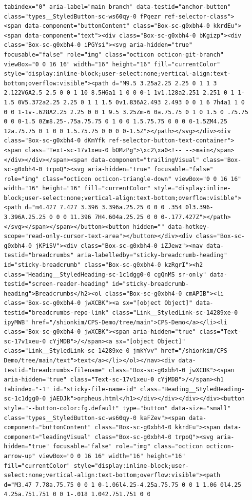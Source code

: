 \documentclass[
  letterpaper,
]{book}
\begin{document}
\begin{verbatim}
tabindex="0" aria-label="main branch" data-testid="anchor-button" class="types__StyledButton-sc-ws60qy-0 fPqezr ref-selector-class"><span data-component="buttonContent" class="Box-sc-g0xbh4-0 kkrdEu"><span data-component="text"><div class="Box-sc-g0xbh4-0 bKgizp"><div class="Box-sc-g0xbh4-0 iPGYsi"><svg aria-hidden="true" focusable="false" role="img" class="octicon octicon-git-branch" viewBox="0 0 16 16" width="16" height="16" fill="currentColor" style="display:inline-block;user-select:none;vertical-align:text-bottom;overflow:visible"><path d="M9.5 3.25a2.25 2.25 0 1 1 3 2.122V6A2.5 2.5 0 0 1 10 8.5H6a1 1 0 0 0-1 1v1.128a2.251 2.251 0 1 1-1.5 0V5.372a2.25 2.25 0 1 1 1.5 0v1.836A2.493 2.493 0 0 1 6 7h4a1 1 0 0 0 1-1v-.628A2.25 2.25 0 0 1 9.5 3.25Zm-6 0a.75.75 0 1 0 1.5 0 .75.75 0 0 0-1.5 0Zm8.25-.75a.75.75 0 1 0 0 1.5.75.75 0 0 0 0-1.5ZM4.25 12a.75.75 0 1 0 0 1.5.75.75 0 0 0 0-1.5Z"></path></svg></div><div class="Box-sc-g0xbh4-0 dKmYfk ref-selector-button-text-container"><span class="Text-sc-17v1xeu-0 bOMzPg">\xc2\xa0<!-- -->main</span></div></div></span><span data-component="trailingVisual" class="Box-sc-g0xbh4-0 trpoQ"><svg aria-hidden="true" focusable="false" role="img" class="octicon octicon-triangle-down" viewBox="0 0 16 16" width="16" height="16" fill="currentColor" style="display:inline-block;user-select:none;vertical-align:text-bottom;overflow:visible"><path d="m4.427 7.427 3.396 3.396a.25.25 0 0 0 .354 0l3.396-3.396A.25.25 0 0 0 11.396 7H4.604a.25.25 0 0 0-.177.427Z"></path></svg></span></span></button><button hidden="" data-hotkey-scope="read-only-cursor-text-area"></button></div><div class="Box-sc-g0xbh4-0 jKPiSV"><div class="Box-sc-g0xbh4-0 iZJewz"><nav data-testid="breadcrumbs" aria-labelledby="sticky-breadcrumb-heading" id="sticky-breadcrumb" class="Box-sc-g0xbh4-0 kzRgrI"><h2 class="Heading__StyledHeading-sc-1c1dgg0-0 cgQnMS sr-only" data-testid="screen-reader-heading" id="sticky-breadcrumb-heading">Breadcrumbs</h2><ol class="Box-sc-g0xbh4-0 cmAPIB"><li class="Box-sc-g0xbh4-0 jwXCBK"><a sx="[object Object]" data-testid="breadcrumbs-repo-link" class="Link__StyledLink-sc-14289xe-0 ipyMWB" href="/shionkim/CPS-Demo/tree/main">CPS-Demo</a></li><li class="Box-sc-g0xbh4-0 jwXCBK"><span aria-hidden="true" class="Text-sc-17v1xeu-0 cYjMDB">/</span><a sx="[object Object]" class="Link__StyledLink-sc-14289xe-0 jmkYvv" href="/shionkim/CPS-Demo/tree/main/text">text</a></li></ol></nav><div data-testid="breadcrumbs-filename" class="Box-sc-g0xbh4-0 jwXCBK"><span aria-hidden="true" class="Text-sc-17v1xeu-0 cYjMDB">/</span><h1 tabindex="-1" id="sticky-file-name-id" class="Heading__StyledHeading-sc-1c1dgg0-0 jAEDJk">orpheus.html</h1></div></div></div></div><button style="--button-color:fg.default" type="button" data-size="small" class="types__StyledButton-sc-ws60qy-0 kaFZev"><span data-component="buttonContent" class="Box-sc-g0xbh4-0 kkrdEu"><span data-component="leadingVisual" class="Box-sc-g0xbh4-0 trpoQ"><svg aria-hidden="true" focusable="false" role="img" class="octicon octicon-arrow-up" viewBox="0 0 16 16" width="16" height="16" fill="currentColor" style="display:inline-block;user-select:none;vertical-align:text-bottom;overflow:visible"><path d="M3.47 7.78a.75.75 0 0 1 0-1.06l4.25-4.25a.75.75 0 0 1 1.06 0l4.25 4.25a.751.751 0 0 1-.018 1.042.751.751 0 0 
\end{verbatim}
\end{document}

